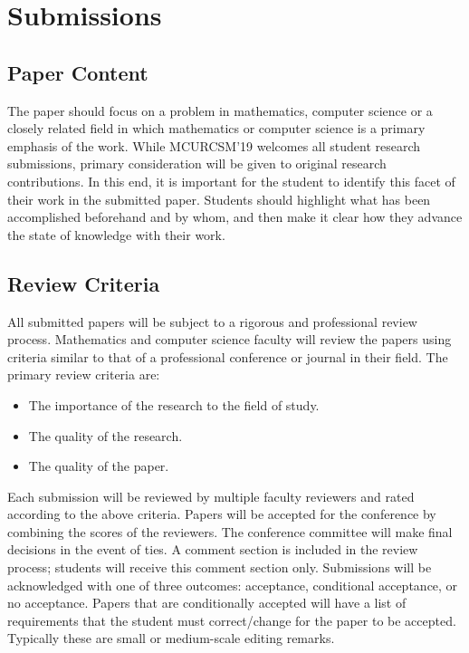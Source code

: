 \documentclass{mcurcsm}
\begin{document}
\section{Submissions}
\subsection{Paper Content}
The paper should focus on a problem in mathematics, computer science or a
closely related field in which mathematics or computer science is a primary
emphasis of the work. While MCURCSM'19 welcomes all student research
submissions, primary consideration will be given to original research
contributions. In this end, it is important for the student to identify this
facet of their work in the submitted paper. Students should highlight what has
been accomplished beforehand and by whom, and then make it clear how they
advance the state of knowledge with their work. 

\subsection{Review Criteria}
All submitted papers will be subject to a rigorous and professional review
process. Mathematics and computer science faculty will review the papers using
criteria similar to that of a professional conference or journal in their field.
The primary review criteria are: 

\begin{itemize}
    \item The importance of the research to the field of study. 
    \item  The quality of the research. 
    \item  The quality of the paper. 
\end{itemize}

Each submission will be reviewed by multiple 
faculty reviewers and rated according to the above criteria. Papers will be
accepted for the conference by combining the scores of the reviewers. The
conference committee will make final decisions in the event of ties. A comment
section is included in the review process; students will receive this comment
section only. 
Submissions will be acknowledged with one of three outcomes: acceptance,
conditional acceptance, or no acceptance. Papers that are conditionally accepted
will have a list of requirements that the student must correct/change for the
paper to be accepted. Typically these are small or medium-scale editing remarks. 
\end{document}
